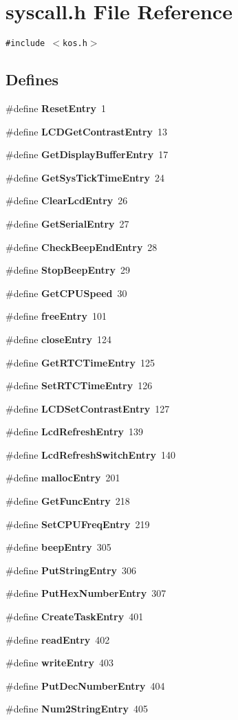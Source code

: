 \section{syscall.h File Reference}
\label{syscall_8h}
{\tt \#include $<$kos.h$>$}\par
\subsection*{Defines}
\begin{CompactItemize}
\item 
\#define {\bf Reset\-Entry}\ 1
\item 
\#define {\bf LCDGet\-Contrast\-Entry}\ 13
\item 
\#define {\bf Get\-Display\-Buffer\-Entry}\ 17
\item 
\#define {\bf Get\-Sys\-Tick\-Time\-Entry}\ 24
\item 
\#define {\bf Clear\-Lcd\-Entry}\ 26
\item 
\#define {\bf Get\-Serial\-Entry}\ 27
\item 
\#define {\bf Check\-Beep\-End\-Entry}\ 28
\item 
\#define {\bf Stop\-Beep\-Entry}\ 29
\item 
\#define {\bf Get\-CPUSpeed}\ 30
\item 
\#define {\bf free\-Entry}\ 101
\item 
\#define {\bf close\-Entry}\ 124
\item 
\#define {\bf Get\-RTCTime\-Entry}\ 125
\item 
\#define {\bf Set\-RTCTime\-Entry}\ 126
\item 
\#define {\bf LCDSet\-Contrast\-Entry}\ 127
\item 
\#define {\bf Lcd\-Refresh\-Entry}\ 139
\item 
\#define {\bf Lcd\-Refresh\-Switch\-Entry}\ 140
\item 
\#define {\bf malloc\-Entry}\ 201
\item 
\#define {\bf Get\-Func\-Entry}\ 218
\item 
\#define {\bf Set\-CPUFreq\-Entry}\ 219
\item 
\#define {\bf beep\-Entry}\ 305
\item 
\#define {\bf Put\-String\-Entry}\ 306
\item 
\#define {\bf Put\-Hex\-Number\-Entry}\ 307
\item 
\#define {\bf Create\-Task\-Entry}\ 401
\item 
\#define {\bf read\-Entry}\ 402
\item 
\#define {\bf write\-Entry}\ 403
\item 
\#define {\bf Put\-Dec\-Number\-Entry}\ 404
\item 
\#define {\bf Num2String\-Entry}\ 405
\end{CompactItemize}
